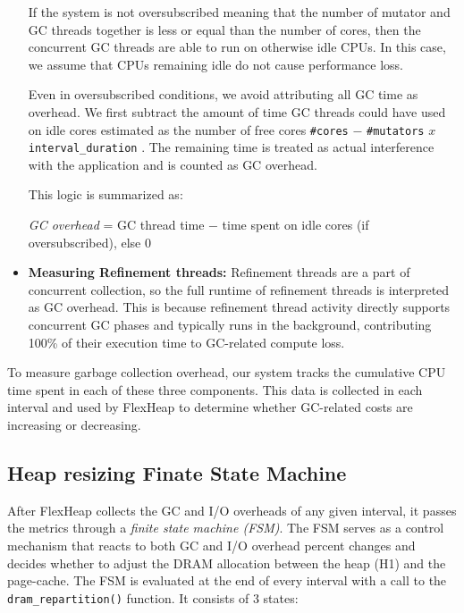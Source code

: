 \begin{itemize}
  If the system is not oversubscribed meaning that the number of mutator and GC
  threads together is less or equal than the number of cores, then the concurrent 
  GC threads are able to run on otherwise idle CPUs. In this case, we assume that
  CPUs remaining idle do not cause performance loss.

  Even in oversubscribed conditions, we avoid attributing all GC time as overhead.
  We first subtract the amount of time GC threads could have used on idle cores estimated 
  as the number of free cores \texttt{\#cores} $-$ \texttt{\#mutators} $x$ \texttt{interval\_duration} .
  The remaining time is treated as actual interference with the
  application and is counted as GC overhead.

  This logic is summarized as:

  \begin{center}
  \textit{GC overhead} = GC thread time $-$ time spent on idle cores (if oversubscribed), else $0$
  \end{center}

  \item \textbf{Measuring Refinement threads:} Refinement threads are a part of concurrent collection, 
  so the full runtime of refinement threads is interpreted as GC overhead. This is because refinement thread 
  activity directly supports concurrent GC phases and typically runs in the background,
  contributing 100\% of their execution time to GC-related compute loss.

\end{itemize}

To measure garbage collection overhead, our system tracks the cumulative CPU time spent in each of these three components. 
This data is collected in each interval and used by FlexHeap to determine whether GC-related costs are increasing or decreasing.

\subsection{Heap resizing Finate State Machine}

After FlexHeap collects the GC and I/O overheads of any given interval, it passes the metrics through 
a \textit{finite state machine (FSM)}. The FSM serves as a control mechanism 
that reacts to both GC and I/O overhead percent changes and decides whether to adjust the DRAM allocation 
between the heap (H1) and the page-cache. The FSM is evaluated at the end of every interval with a
call to the \texttt{dram\_repartition()} function. It consists of 3 states:

